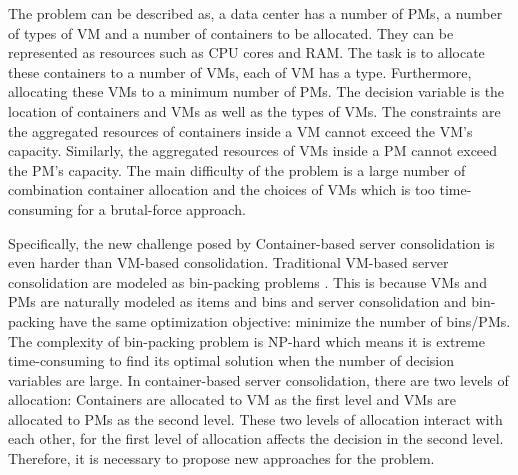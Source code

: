 The problem can be described as, a data center has a number of PMs, a number of types of VM and a number of containers to be allocated. They can be represented as resources 
such as CPU cores and RAM. The task is to allocate these containers to a number of VMs, each of VM has a type. Furthermore, allocating these VMs to a minimum number of PMs. The decision variable is the location of containers and VMs as well as the types of VMs. The constraints are the aggregated resources of containers inside a VM cannot exceed the VM's capacity. Similarly, the aggregated resources of VMs inside a PM cannot exceed the PM's capacity. The main difficulty of the problem is a large number of combination container allocation and the choices of VMs which is too time-consuming for a brutal-force approach.

Specifically, the new challenge posed by Container-based server consolidation is even harder than VM-based consolidation. Traditional VM-based server consolidation are modeled as bin-packing problems \cite{Mann:2015ua}. This is because VMs and PMs are naturally modeled as items and bins and server consolidation and bin-packing have the same optimization objective: minimize the number of bins/PMs. The complexity of bin-packing problem is NP-hard which means it is extreme time-consuming to find its optimal solution when the number of decision variables are large. In container-based server consolidation, there are two levels of allocation: Containers are allocated to VM as the first level and VMs are allocated to PMs as the second level. These two levels of allocation interact with each other, for the first level of allocation affects the decision in the second level. Therefore, it is necessary to propose new approaches for the problem.

